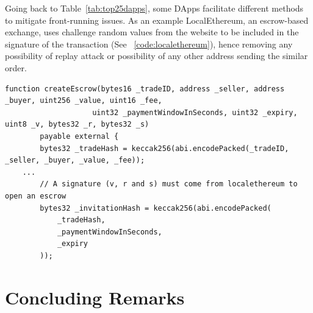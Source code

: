 

Going back to Table~\ref{tab:top25dapps}, some DApps facilitate different methods to mitigate front-running issues. As an example LocalEthereum, an escrow-based exchange, uses challenge random values from the website to be included in the signature of the transaction (See ~\ref{code:localethereum}), hence removing any possibility of replay attack or possibility of any other address sending the similar order.

\begin{lstlisting}[basicstyle=\scriptsize\ttfamily,caption={Code snippet from LocalEthereum smart contract. Values V,R and S are set by LocalEtherem to have a valid signature, also the tradeHash uses buyer and seller addresses, mitigating the possibility of front-running by a third party.},label={code:localethereum},float]
    function createEscrow(bytes16 _tradeID, address _seller, address _buyer, uint256 _value, uint16 _fee,
					uint32 _paymentWindowInSeconds, uint32 _expiry, uint8 _v, bytes32 _r, bytes32 _s) 
        payable external {
        bytes32 _tradeHash = keccak256(abi.encodePacked(_tradeID, _seller, _buyer, _value, _fee));
	...
        // A signature (v, r and s) must come from localethereum to open an escrow
        bytes32 _invitationHash = keccak256(abi.encodePacked(
            _tradeHash,
            _paymentWindowInSeconds,
            _expiry
        )); 
\end{lstlisting}





\section{Concluding Remarks}





